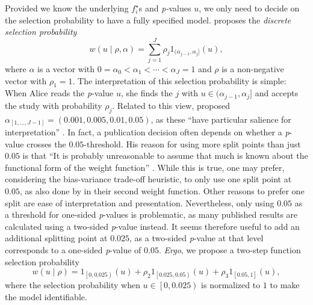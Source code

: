 \documentclass{article}
\theoremstyle{plain}
\theoremstyle{definition}
\begin{document}
Provided we know the underlying $f_{i}^{\star}$s and \emph{p-}values $u$, we only need to decide on the selection probability to have a fully specified model. \citet{hedges1992modeling} proposes the \emph{discrete selection probability}
\begin{equation}
w\left(u\mid\rho,\alpha\right)=\sum_{j=1}^{J}\rho_{j}1_{(\alpha_{j-1},\alpha_{j}]}\left(u\right),\label{eq:Weighted model step function}
\end{equation}
where $\alpha$ is a vector with $0=\alpha_{0}<\alpha_{1}<\cdots<\alpha_{J}=1$ and $\rho$ is a non-negative vector with $\rho_{1}=1$. The interpretation of this selection probability is simple: When Alice reads the \emph{p}-value $u$, she finds the $j$ with $u\in(\alpha_{j-1},\alpha_{j}]$ and accepts the study with probability $\rho_{j}$. Related to this view, \citet{hedges1992modeling} proposed $\alpha_{[1,\dots,J-1]} = \left(0.001,0.005,0.01,0.05\right)$, as these ``have particular salience for interpretation'' \citep{hedges1992modeling}. In fact, a publication decision often depends on whether a \emph{p}-value crosses the $0.05$-threshold. His reason for using more split points than just $0.05$ is that ``It is probably unreasonable to assume that much is known about the functional form of the weight function'' \citep{hedges1992modeling}. While this is true, one may prefer, considering the bias-variance trade-off heuristic, to only use one split point at $0.05$, as also done by \citet{iyengar1988selection} in their second weight function. Other reasons to prefer one split are ease of interpretation and presentation. Nevertheless, only using $0.05$ as a threshold for one-sided \emph{p}-values is problematic, as many published results are calculated using a two-sided \emph{p}-value instead. It seems therefore useful to add an additional splitting point at $0.025$, as a two-sided \emph{p}-value at that level corresponds to a one-sided \emph{p}-value of $0.05$. \emph{Ergo}, we propose a two-step function selection probability
\[
w\left(u\mid\rho\right)=1_{\left[0,0.025\right)}\left(u\right)+\rho_{2}1_{\left[0.025,0.05\right)}\left(u\right)+\rho_{3}1_{\left[0.05,1\right]}\left(u\right),
\]
where the selection probability when $u\in\left[0,0.025\right)$ is normalized to $1$ to make the model identifiable.
\end{document}
